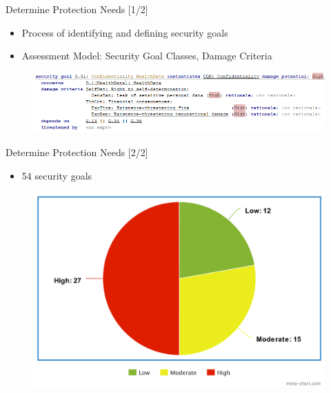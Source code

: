 \documentclass[xcolor=table]{beamer}
\begin{document}
\begin{frame}{Determine Protection Needs [1/2]}
\begin{itemize}
    \item Process of identifying and defining security goals
    \item Assessment Model: Security Goal Classes, Damage Criteria
\end{itemize}
 \begin{figure}[H]
  \includegraphics[width=\linewidth]{img/secgoal.png}
  \label{fig:secgoal}
\end{figure}
\end{frame}

\begin{frame}{Determine Protection Needs [2/2]}
\begin{itemize}
    \item 54 security goals
\end{itemize}
 \begin{figure}[H]
  \includegraphics[width=\linewidth]{img/secgoalchart.png}
  \label{fig:secgoalchart}
\end{figure}
\end{frame}


\end{document}
